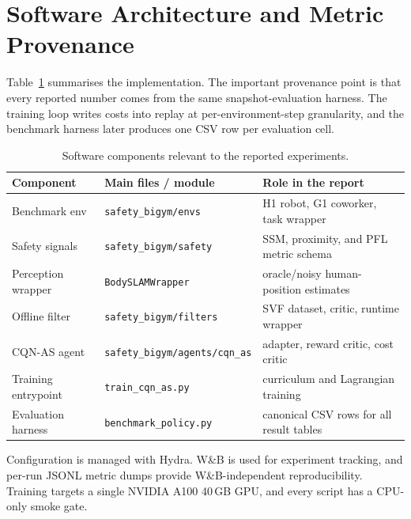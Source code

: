 \documentclass[11pt,a4paper]{report}
\newcommand{\ssm}{SSM}
\newcommand{\pfl}{PFL}
\newcommand{\cqnas}{CQN-AS}
\begin{document}

\section{Software Architecture and Metric Provenance}
\label{sec:impl:arch}
\label{sec:impl:metrics}

Table~\ref{tab:software-architecture} summarises the implementation.
The important provenance point is that every reported number comes from
the same snapshot-evaluation harness. The training loop writes costs
into replay at per-environment-step granularity, and the benchmark
harness later produces one CSV row per evaluation cell.

\begin{table}[htbp]
\centering
\small
\caption{Software components relevant to the reported experiments.}
\label{tab:software-architecture}
\begin{tabular}{lll}
\toprule
Component & Main files / module & Role in the report \\
\midrule
Benchmark env & \texttt{safety\_bigym/envs} & H1 robot, G1 coworker, task wrapper \\
Safety signals & \texttt{safety\_bigym/safety} & \ssm{}, proximity, and \pfl{} metric schema \\
Perception wrapper & \texttt{BodySLAMWrapper} & oracle/noisy human-position estimates \\
Offline filter & \texttt{safety\_bigym/filters} & SVF dataset, critic, runtime wrapper \\
\cqnas{} agent & \texttt{safety\_bigym/agents/cqn\_as} & adapter, reward critic, cost critic \\
Training entrypoint & \texttt{train\_cqn\_as.py} & curriculum and Lagrangian training \\
Evaluation harness & \texttt{benchmark\_policy.py} & canonical CSV rows for all result tables \\
\bottomrule
\end{tabular}
\end{table}

Configuration is managed with Hydra. W\&B is used for experiment
tracking, and per-run JSONL metric dumps provide W\&B-independent
reproducibility. Training targets a single NVIDIA A100 40\,GB GPU, and
every script has a CPU-only smoke gate.
\end{document}
